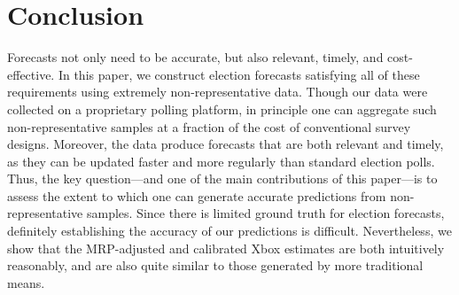 \documentclass[preprint,authoryear,12pt]{elsarticle}
\begin{document}
\section{Conclusion}
Forecasts not only need to be accurate, but also relevant, timely, and cost-effective. 
In this paper, we construct election forecasts satisfying all of these requirements using 
extremely non-representative data.
Though our data were collected on a proprietary polling platform, in principle one can aggregate such non-representative samples
at a fraction of the cost of conventional survey designs.
Moreover, the data produce forecasts that are both relevant and timely, as they can be updated faster and more regularly than standard election polls.
Thus, the key question---and one of the main contributions of this paper---is to assess the extent to which one can generate accurate predictions from non-representative samples.
Since there is limited ground truth for election forecasts, definitely establishing the accuracy of our predictions is difficult.
Nevertheless, we show that the MRP-adjusted and calibrated Xbox estimates are both intuitively reasonably, and are also quite similar to those generated by more traditional means.
\end{document}
